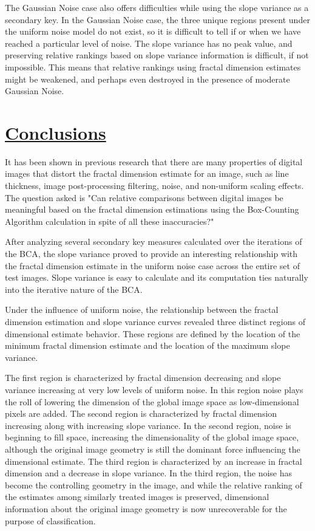 \documentclass[12pt, oneside]{book}
\begin{document}
The Gaussian Noise case also offers difficulties while using the slope variance as a secondary key.  In the Gaussian Noise case, the three unique regions present under the uniform noise model do not exist, so it is difficult to tell if or when we have reached a particular level of noise.  The slope variance has no peak value, and preserving relative rankings based on slope variance information is difficult, if not impossible.  This means that relative rankings using fractal dimension estimates might be weakened, and perhaps even destroyed in the presence of moderate Gaussian Noise.


%
%
\section{\underline{Conclusions}}
It has been shown in previous research that there are many properties of digital images that distort the fractal dimension estimate for an image, such as line thickness, image post-processing filtering, noise, and non-uniform scaling effects.  The question asked is "Can relative comparisons between digital images be meaningful based on the fractal dimension estimations using the Box-Counting Algorithm calculation in spite of all these inaccuracies?"

After analyzing several secondary key measures calculated over the iterations of the BCA, the slope variance proved to provide an interesting relationship with the fractal dimension estimate in the uniform noise case across the entire set of test images.  Slope variance is easy to calculate and its computation ties naturally into the iterative nature of the BCA.

Under the influence of uniform noise, the relationship between the fractal dimension estimation and slope variance curves revealed three distinct regions of dimensional estimate behavior.  These regions are defined by the location of the minimum fractal dimension estimate and the location of the maximum slope variance. 

The first region is characterized by fractal dimension decreasing and slope variance increasing at very low levels of uniform noise.  In this region noise plays the roll of lowering the dimension of the global image space as low-dimensional pixels are added.  The second region is characterized by fractal dimension increasing along with increasing slope variance.  In the second region, noise is beginning to fill space, increasing the dimensionality of the global image space, although the original image geometry is still the dominant force influencing the dimensional estimate.  The third region is characterized by an increase in fractal dimension and a decrease in slope variance.  In the third region, the noise has become the controlling geometry in the image, and while the relative ranking of the estimates among similarly treated images is preserved, dimensional information about the original image geometry is now unrecoverable for the purpose of classification.
\end{document}
